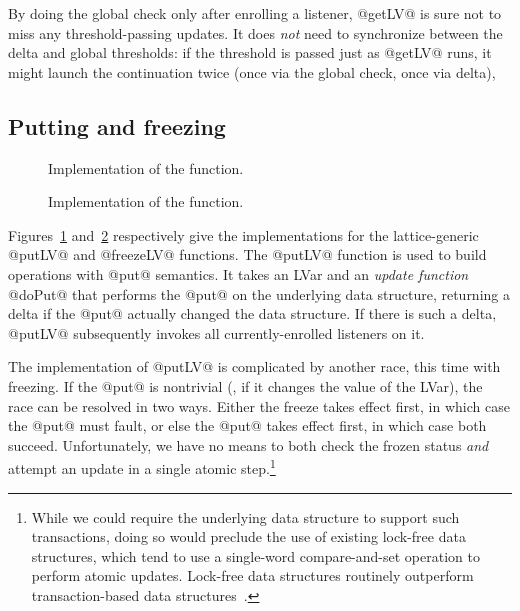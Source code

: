 By doing the global check only after enrolling a listener, @getLV@ is
sure not to miss any threshold-passing updates.  It does \emph{not}
need to synchronize between the delta and global thresholds: if the
threshold is passed just as @getLV@ runs, it might launch the
continuation twice (once via the global check, once via delta), 

\subsection{Putting and freezing}


\begin{figure}
  \singlespacing
  
  \doublespacing
  \caption{Implementation of the 
    function.}\label{fig:implementation-putLV}
\end{figure}

\begin{figure}
  \singlespacing
  
  \doublespacing
  \caption{Implementation of the 
    function.}\label{fig:implementation-freezeLV}
\end{figure}

Figures~\ref{fig:implementation-putLV}
and~\ref{fig:implementation-freezeLV} respectively give the
implementations for the lattice-generic @putLV@ and @freezeLV@
functions.  The @putLV@ function is used to build operations with
@put@ semantics.  It takes an LVar and an \emph{update function}
@doPut@ that performs the @put@ on the underlying data structure,
returning a delta if the @put@ actually changed the data structure.
If there is such a delta, @putLV@ subsequently invokes all
currently-enrolled listeners on it.

The implementation of @putLV@ is complicated by another race, this
time with freezing.  If the @put@ is nontrivial (\ie, if it changes
the value of the LVar), the race can be resolved in two ways.  Either
the freeze takes effect first, in which case the @put@ must fault, or
else the @put@ takes effect first, in which case both succeed.
Unfortunately, we have no means to both check the frozen status
\emph{and} attempt an update in a single atomic step.\footnote{While
  we could require the underlying data structure to support such
  transactions, doing so would preclude the use of existing lock-free
  data structures, which tend to use a single-word compare-and-set
  operation to perform atomic updates.  Lock-free data structures
  routinely outperform transaction-based data
  structures~\cite{practical-lock-freedom}.}

